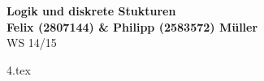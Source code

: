 \documentclass[fleqn, 12pt, a4paper]{article}
\begin{document}


	\begin{center}
	{\Large{\bfseries{Logik und diskrete Stukturen}}}\\[0.5cm]
	{\large{\bfseries{Felix (2807144) \& Philipp (2583572) Müller}}}\\[0.4cm]
	WS 14/15
	\end{center}


	{4.tex}
\end{document}
